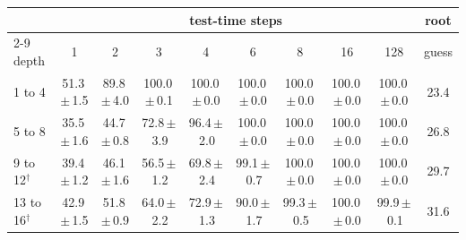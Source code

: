 \begin{tabular}{lccccccccc}
\toprule
& \multicolumn{8}{c}{test-time steps} & root \\
\cmidrule(lr){2-9}
depth & 1 & 2 & 3 & 4 & 6 & 8 & 16 & 128 & guess \\
\midrule
1 to 4 & 51.3\,$\pm$\,1.5 & 89.8\,$\pm$\,4.0 & 100.0\,$\pm$\,0.1 & 100.0\,$\pm$\,0.0 & 100.0\,$\pm$\,0.0 & 100.0\,$\pm$\,0.0 & 100.0\,$\pm$\,0.0 & 100.0\,$\pm$\,0.0 & 23.4 \\
5 to 8 & 35.5\,$\pm$\,1.6 & 44.7\,$\pm$\,0.8 & 72.8\,$\pm$\,3.9 & 96.4\,$\pm$\,2.0 & 100.0\,$\pm$\,0.0 & 100.0\,$\pm$\,0.0 & 100.0\,$\pm$\,0.0 & 100.0\,$\pm$\,0.0 & 26.8 \\
9 to 12$^\dagger$ & 39.4\,$\pm$\,1.2 & 46.1\,$\pm$\,1.6 & 56.5\,$\pm$\,1.2 & 69.8\,$\pm$\,2.4 & 99.1\,$\pm$\,0.7 & 100.0\,$\pm$\,0.0 & 100.0\,$\pm$\,0.0 & 100.0\,$\pm$\,0.0 & 29.7 \\
13 to 16$^\dagger$ & 42.9\,$\pm$\,1.5 & 51.8\,$\pm$\,0.9 & 64.0\,$\pm$\,2.2 & 72.9\,$\pm$\,1.3 & 90.0\,$\pm$\,1.7 & 99.3\,$\pm$\,0.5 & 100.0\,$\pm$\,0.0 & 99.9\,$\pm$\,0.1 & 31.6 \\
\bottomrule
\end{tabular}
